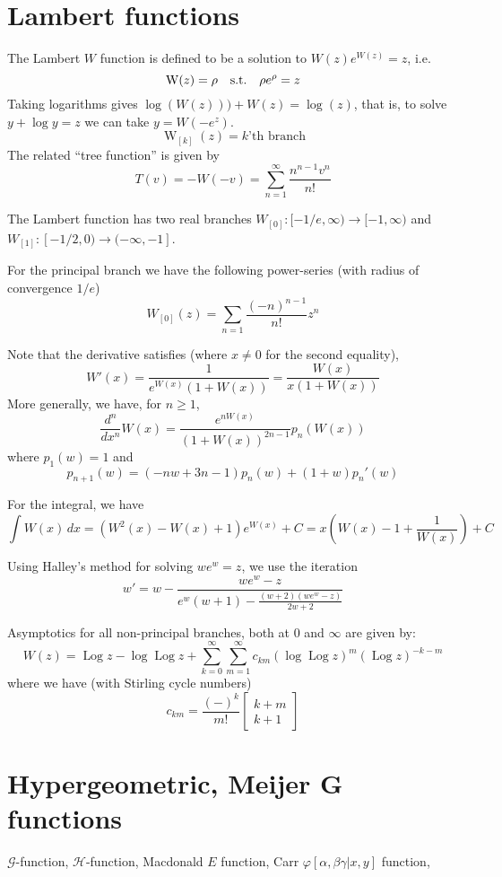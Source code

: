 \documentclass[10pt,dvipdfmx,letterpaper,twoside]{article}
\let\O=\operatorname
\let\al=\alpha
\let\gam=\gamma
\let\phi=\varphi
\begin{document}
\section{Lambert functions}
The Lambert $W$ function is defined to be a solution to $W(z)e^{W(z)}=z$, i.e.
\[ \O{W}(z) = \rho \text{\quad s.t.\quad} \rho e^\rho = z \]
Taking logarithms gives $\log(W(z))) + W(z) = \log(z)$, that is, to solve $y+\log y=z$
we can take $y=W(-e^z)$.
\[ \O{W}_{[k]}(z) = \text{$k$'th branch} \]
The related ``tree function'' is given by
\[ T(v) = -W(-v) = \sum_{n=1}^\infty \frac{n^{n-1} v^n}{n!} \]

The Lambert function has two real branches $W_{[0]}:[-1/e,\infty)\to[-1,\infty)$
and $W_{[1]}:[-1/2,0)\to(-\infty,-1]$.

For the principal branch we have the following power-series (with radius of convergence $1/e$)
\[ W_{[0]}(z) = \sum_{n=1}\frac{(-n)^{n-1}}{n!} z^n \]

Note that the derivative satisfies (where $x\neq0$ for the second equality),
\[ W'(x) = \frac{1}{e^{W(x)}(1+W(x))} = \frac{W(x)}{x(1+W(x))} \]
More generally, we have, for $n\geq1$,
\[ \frac{d^n}{dx^n} W(x) = \frac{e^{n W(x)}}{(1+W(x))^{2n-1}} p_n(W(x)) \]
where $p_1(w)=1$ and
\[ p_{n+1}(w) = (-nw + 3n-1) p_{n}(w) + (1+w)p_n'(w) \]

For the integral, we have
\[ \int W(x)\,dx = (W^2(x) - W(x) + 1)e^{W(x)} + C = x(W(x)-1+\frac{1}{W(x)})+C \]

Using Halley's method for solving $we^w=z$, we use the iteration
\[ w' = w - \frac{w e^w - z}{e^w(w+1)- \frac{(w+2)(we^w-z)}{2w+2}} \]

Asymptotics for all non-principal branches, both at $0$ and $\infty$ are given by:
\[ W(z) = \O{Log} z - \log\O{Log} z + \sum_{k=0}^\infty\sum_{m=1}^\infty c_{km} (\log\O{Log} z)^m (\O{Log} z)^{-k-m} \]
where we have (with Stirling cycle numbers)
\[ c_{km} = \frac{(-)^k}{m!}\begin{bmatrix}k+m\\k+1\end{bmatrix} \]

\section{Hypergeometric, Meijer G functions}
$\mathcal{G}$-function, $\mathcal{H}$-function, Macdonald $E$ function, Carr $\phi[\al,\beta\gam|x,y]$ function,
\end{document}

